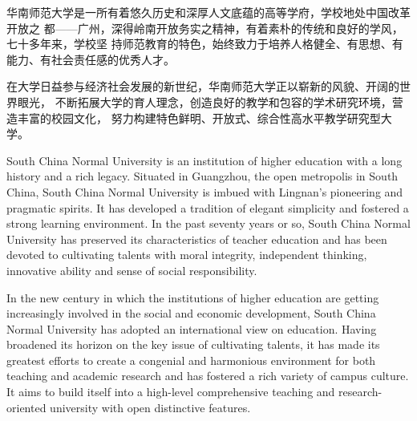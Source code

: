 \begin{cabstract}
华南师范大学是一所有着悠久历史和深厚人文底蕴的高等学府，学校地处中国改革开放之%
都——广州，深得岭南开放务实之精神，有着素朴的传统和良好的学风，七十多年来，学校坚%
持师范教育的特色，始终致力于培养人格健全、有思想、有能力、有社会责任感的优秀人才。%

在大学日益参与经济社会发展的新世纪，华南师范大学正以崭新的风貌、开阔的世界眼光，%
不断拓展大学的育人理念，创造良好的教学和包容的学术研究环境，营造丰富的校园文化，%
努力构建特色鲜明、开放式、综合性高水平教学研究型大学。%
\end{cabstract}

\begin{eabstract}
  South China Normal University is an institution of higher education with a
  long history and a rich legacy. Situated in Guangzhou, the open metropolis in
  South China, South China Normal University is imbued with Lingnan's
  pioneering and pragmatic spirits. It has developed a tradition of elegant
  simplicity and fostered a strong learning environment. In the past seventy
  years or so, South China Normal University has preserved its characteristics
  of teacher education and has been devoted to cultivating talents with moral
  integrity, independent thinking, innovative ability and sense of social
  responsibility.

  In the new century in which the institutions of higher education are getting
  increasingly involved in the social and economic development, South China
  Normal University has adopted an international view on education. Having
  broadened its horizon on the key issue of cultivating talents, it has made its
  greatest efforts to create a congenial and harmonious environment for both
  teaching and academic research and has fostered a rich variety of campus
  culture. It aims to build itself into a high-level comprehensive teaching and
  research-oriented university with open distinctive features.
\end{eabstract}
